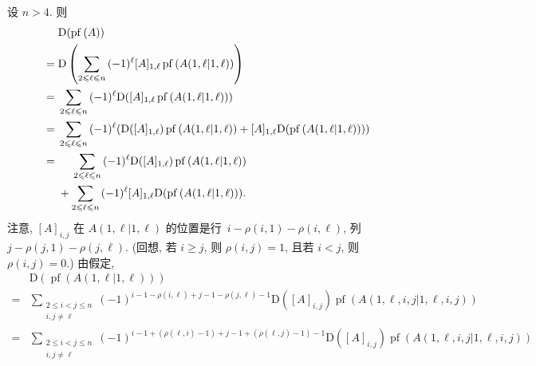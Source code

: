 \documentclass[../libro.tex]{subfiles}
\begin{document}
\begin{example}
    设 \(n > 4\).
    则
    \begin{align*}
        &
        \mathrm{D} (\operatorname{pf} {(A)})
        \\
        = {} &
        \mathrm{D} \left(
            \sum_{2 \leq \ell \leq n}
            {(-1)^{\ell} [A]_{1,\ell}
            \operatorname{pf} {(A({1,\ell}|{1,\ell}))}}
        \right)
        \\
        = {} &
        \sum_{2 \leq \ell \leq n}
        {(-1)^{\ell}
            \mathrm{D} (
                [A]_{1,\ell}
            \operatorname{pf} {(A({1,\ell}|{1,\ell}))})
        }
        \\
        = {} &
        \sum_{2 \leq \ell \leq n}
        {(-1)^{\ell}
            (
                \mathrm{D} ([A]_{1,\ell})
                \operatorname{pf} {(A({1,\ell}|{1,\ell}))}
                +
                [A]_{1,\ell}
                \mathrm{D} (\operatorname{pf} {(A({1,\ell}|{1,\ell}))})
            )
        }
        \\
        = {} &
        \hphantom{{} + {}}
        \sum_{2 \leq \ell \leq n}
        {(-1)^{\ell}
            \mathrm{D} ([A]_{1,\ell})
            \operatorname{pf} {(A({1,\ell}|{1,\ell}))}
        }
        \\
        & +
        \sum_{2 \leq \ell \leq n}
        {(-1)^{\ell} [A]_{1,\ell}
            \mathrm{D} (\operatorname{pf} {(A({1,\ell}|{1,\ell}))})
        }.
    \end{align*}
    注意, \([A]_{i,j}\) 在 \(A({1,\ell}|{1,\ell})\)
    的位置是行~\(i - \rho(i, 1) - \rho(i, \ell)\),
    列~\(j - \rho(j, 1) - \rho(j, \ell)\).
    (回想, %
    若 \(i \geq j\), 则 \(\rho(i, j) = 1\),
    且若 \(i < j\), 则 \(\rho(i, j) = 0\).) %
    由假定,
    \begin{align*}
        &
        \mathrm{D} (\operatorname{pf} {(A({1,\ell}|{1,\ell}))})
        \\
        = {} &
        \sum_{\substack{2 \leq i < j \leq n \\ i, j \neq \ell}}
        {(-1)^{i-1-\rho(i, \ell)+j-1-\rho(j, \ell)-1}
            \mathrm{D} ([A]_{i,j})
        \operatorname{pf} {(A({1,\ell,i,j}|{1,\ell,i,j}))}}
        \\
        = {} &
        \sum_{\substack{2 \leq i < j \leq n \\ i, j \neq \ell}}
        {(-1)^{i-1+(\rho(\ell, i)-1)+j-1+(\rho(\ell, j)-1)-1}
            \mathrm{D} ([A]_{i,j})
        \operatorname{pf} {(A({1,\ell,i,j}|{1,\ell,i,j}))}}
        \\

\end{align*}
\end{example}
\end{document}
